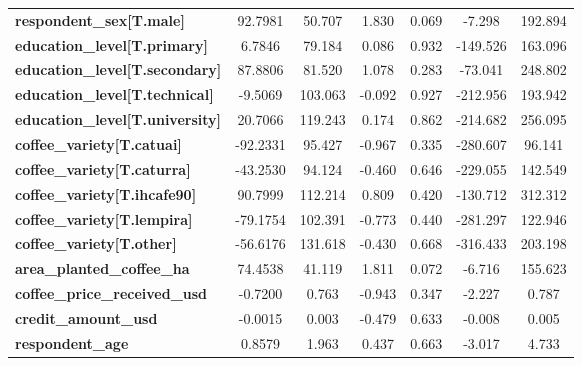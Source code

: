\begin{center}
\begin{tabular}{lcccccc}
\textbf{respondent\_sex[T.male]}        &      92.7981  &       50.707     &     1.830  &         0.069        &       -7.298    &      192.894     \\
\textbf{education\_level[T.primary]}    &       6.7846  &       79.184     &     0.086  &         0.932        &     -149.526    &      163.096     \\
\textbf{education\_level[T.secondary]}  &      87.8806  &       81.520     &     1.078  &         0.283        &      -73.041    &      248.802     \\
\textbf{education\_level[T.technical]}  &      -9.5069  &      103.063     &    -0.092  &         0.927        &     -212.956    &      193.942     \\
\textbf{education\_level[T.university]} &      20.7066  &      119.243     &     0.174  &         0.862        &     -214.682    &      256.095     \\
\textbf{coffee\_variety[T.catuai]}      &     -92.2331  &       95.427     &    -0.967  &         0.335        &     -280.607    &       96.141     \\
\textbf{coffee\_variety[T.caturra]}     &     -43.2530  &       94.124     &    -0.460  &         0.646        &     -229.055    &      142.549     \\
\textbf{coffee\_variety[T.ihcafe90]}    &      90.7999  &      112.214     &     0.809  &         0.420        &     -130.712    &      312.312     \\
\textbf{coffee\_variety[T.lempira]}     &     -79.1754  &      102.391     &    -0.773  &         0.440        &     -281.297    &      122.946     \\
\textbf{coffee\_variety[T.other]}       &     -56.6176  &      131.618     &    -0.430  &         0.668        &     -316.433    &      203.198     \\
\textbf{area\_planted\_coffee\_ha}      &      74.4538  &       41.119     &     1.811  &         0.072        &       -6.716    &      155.623     \\
\textbf{coffee\_price\_received\_usd}   &      -0.7200  &        0.763     &    -0.943  &         0.347        &       -2.227    &        0.787     \\
\textbf{credit\_amount\_usd}            &      -0.0015  &        0.003     &    -0.479  &         0.633        &       -0.008    &        0.005     \\
\textbf{respondent\_age}                &       0.8579  &        1.963     &     0.437  &         0.663        &       -3.017    &        4.733     \\

\end{tabular}
\end{center}
